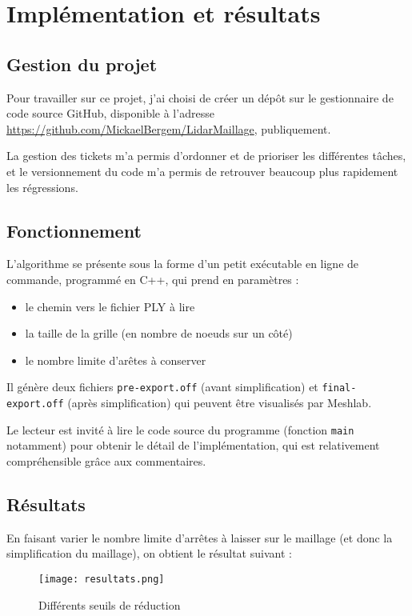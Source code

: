 \newpage
\section{Implémentation et résultats}

\subsection{Gestion du projet}
Pour travailler sur ce projet, j'ai choisi de créer un dépôt sur le gestionnaire de code source GitHub, disponible à l'adresse \url{https://github.com/MickaelBergem/LidarMaillage}, publiquement.

La gestion des tickets m'a permis d'ordonner et de prioriser les différentes tâches, et le versionnement du code m'a permis de retrouver beaucoup plus rapidement les régressions.

\subsection{Fonctionnement}
L'algorithme se présente sous la forme d'un petit exécutable en ligne de commande, programmé en C++, qui prend en paramètres :
\begin{itemize}
 \item le chemin vers le fichier PLY à lire
 \item la taille de la grille (en nombre de noeuds sur un côté)
 \item le nombre limite d'arêtes à conserver
\end{itemize}

Il génère deux fichiers \texttt{pre-export.off} (avant simplification) et \texttt{final-export.off} (après simplification) qui peuvent être visualisés par Meshlab.

Le lecteur est invité à lire le code source du programme (fonction \texttt{main} notamment) pour obtenir le détail de l'implémentation, qui est relativement compréhensible grâce aux commentaires.

\subsection{Résultats}

En faisant varier le nombre limite d'arrêtes à laisser sur le maillage (et donc la simplification du maillage), on obtient le résultat suivant :

\begin{figure}[H]
  \centering
   \texttt{[image: resultats.png]}
   \caption{Différents seuils de réduction}
   \label{resultat}
\end{figure}

